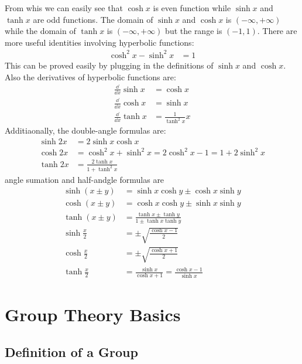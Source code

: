 From whis we can easily see that $\cosh x$ is even function while $\sinh x$ and $\tanh x$ are odd functions. The domain of $\sinh x$ and $\cosh x$ is $(-\infty, +\infty)$ while the domain of $\tanh x$ is $(-\infty, +\infty)$ but the range is $(-1, 1)$. There are more useful identities involving hyperbolic functions:
\begin{align}
    \cosh^2 x - \sinh^2 x & = 1 
\end{align}
This can be proved easily by plugging in the definitions of $\sinh x$ and $\cosh x$. Also the derivatives of hyperbolic functions are:
\begin{align}
    \frac{\dd}{\dd x} \sinh x & = \cosh x \\
    \frac{\dd}{\dd x} \cosh x & = \sinh x \\
    \frac{\dd}{\dd x} \tanh x & = \frac{1}{\tanh^2 x} x
\end{align}
Additiaonally, the double-angle formulas are:
\begin{align}
    \sinh 2x & = 2 \sinh x \cosh x \\
    \cosh 2x & = \cosh^2 x + \sinh^2 x = 2 \cosh^2 x - 1 = 1 + 2 \sinh^2 x \\
    \tanh 2x & = \frac{2 \tanh x}{1 + \tanh^2 x}
\end{align}
angle sumation and half-andgle formulas are 
\begin{align}
    \sinh (x \pm y) & = \sinh x \cosh y \pm \cosh x \sinh y \\
    \cosh (x \pm y) & = \cosh x \cosh y \pm \sinh x \sinh y \\
    \tanh (x \pm y) & = \frac{\tanh x \pm \tanh y}{1 \pm \tanh x \tanh y} \\
    \sinh \frac{x}{2} & = \pm \sqrt{\frac{\cosh x - 1}{2}} \\
    \cosh \frac{x}{2} & = \pm \sqrt{\frac{\cosh x + 1}{2}} \\
    \tanh \frac{x}{2} & = \frac{\sinh x}{\cosh x + 1} = \frac{\cosh x - 1}{\sinh x}
\end{align}



\clearpage
\chapter{Group Theory Basics} \label{chap:GroupTheory}
 

\section{Definition of a Group}

